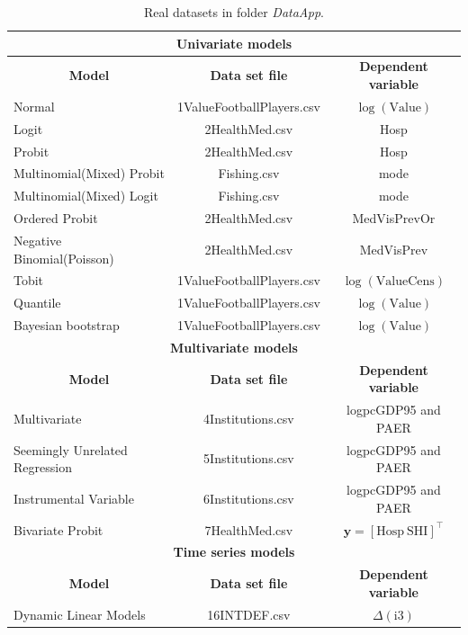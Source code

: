 	\begin{table}[!ht]
		\centering
		\caption{Real datasets in folder \textit{DataApp}.}
		\label{tab:appdata}
		\scriptsize
		\begin{tabular}{|l|c|c|}
			\hline 
	\multicolumn{3}{|c|}{\textbf{Univariate models}} \\
	\hline  
	 \multicolumn{1}{|c|}{\textbf{Model}} & \multicolumn{1}{c}{\textbf{Data set file}} & \multicolumn{1}{|c|}{\textbf{Dependent variable}} \\ 
	 \hline 
	Normal & 1ValueFootballPlayers.csv & $\log(\text{Value})$ \\
	Logit & 2HealthMed.csv & Hosp\\
	Probit & 2HealthMed.csv & Hosp \\
	Multinomial(Mixed) Probit  & Fishing.csv & mode \\
	Multinomial(Mixed) Logit  & Fishing.csv & mode \\
	Ordered Probit  &  2HealthMed.csv & MedVisPrevOr\\
	Negative Binomial(Poisson)   & 2HealthMed.csv & MedVisPrev\\
	Tobit   & 1ValueFootballPlayers.csv & $\log(\text{ValueCens})$ \\
	Quantile &  1ValueFootballPlayers.csv & $\log(\text{Value})$ \\
	Bayesian bootstrap & 1ValueFootballPlayers.csv & $\log(\text{Value})$  \\
	\hline 
			\multicolumn{3}{|c|}{\textbf{Multivariate models}} \\
	\hline  
	\multicolumn{1}{|c|}{\textbf{Model}} & \multicolumn{1}{c}{\textbf{Data set file}} & \multicolumn{1}{|c|}{\textbf{Dependent variable}}\\ 
	\hline
	Multivariate   & 4Institutions.csv & logpcGDP95 and PAER \\
	Seemingly Unrelated Regression & 5Institutions.csv & logpcGDP95 and PAER\\
	Instrumental Variable  & 6Institutions.csv & logpcGDP95 and PAER \\
	Bivariate Probit   & 7HealthMed.csv & $\bm{y}=\left[\text{Hosp} \ \text{SHI}\right]^{\top}$\\
	\hline
	\multicolumn{3}{|c|}{\textbf{Time series models}} \\
	\hline  
	\multicolumn{1}{|c|}{\textbf{Model}} & \multicolumn{1}{c}{\textbf{Data set file}} & \multicolumn{1}{|c|}{\textbf{Dependent variable}} \\ 
	\hline
	Dynamic Linear Models & 16INTDEF.csv  & $\Delta(\text{i3})$ \\

\end{tabular}
\end{table}

